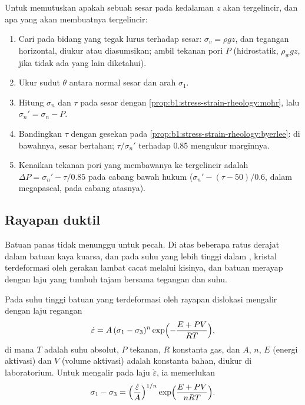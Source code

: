 \begin{method}\label{met:b1:stress-strain-rheology:slip-test}
Untuk memutuskan apakah sebuah sesar pada kedalaman $z$ akan tergelincir, dan apa yang akan membuatnya tergelincir:
\begin{enumerate}
  \item Cari  pada bidang yang tegak lurus terhadap  sesar: $\sigma_v = \rho g z$, dan tegangan horizontal, diukur atau diasumsikan; ambil tekanan pori $P$ (hidrostatik, $\rho_w g z$, jika tidak ada yang lain diketahui).
  \item Ukur sudut $\theta$ antara normal sesar dan arah $\sigma_1$.
  \item Hitung $\sigma_n$ dan $\tau$ pada sesar dengan \cref{prop:b1:stress-strain-rheology:mohr}, lalu $\sigma_n' = \sigma_n - P$.
  \item Bandingkan $\tau$ dengan gesekan pada \cref{prop:b1:stress-strain-rheology:byerlee}: di bawahnya, sesar bertahan; $\tau/\sigma_n'$ terhadap 0.85 mengukur marginnya.
  \item Kenaikan tekanan pori yang membawanya ke tergelincir adalah $\Delta P = \sigma_n' - \tau/0.85$ pada cabang bawah hukum ($\sigma_n' - (\tau - 50)/0.6$, dalam megapascal, pada cabang atasnya).
\end{enumerate}
\end{method}

\subsection*{Rayapan duktil}

Batuan panas tidak menunggu untuk pecah. Di atas beberapa ratus derajat dalam batuan kaya kuarsa, dan pada suhu yang lebih tinggi dalam , kristal terdeformasi oleh gerakan lambat cacat melalui kisinya, dan batuan merayap dengan laju yang tumbuh tajam bersama tegangan dan suhu.

\begin{proposition}\label{prop:b1:stress-strain-rheology:creep}
Pada suhu tinggi batuan yang terdeformasi oleh rayapan dislokasi mengalir dengan laju regangan
\[
  \dot\varepsilon = A\,(\sigma_1 - \sigma_3)^n \exp\Bigl(-\frac{E + PV}{RT}\Bigr),
\]
di mana $T$ adalah suhu absolut, $P$ tekanan, $R$ konstanta gas, dan $A$, $n$, $E$ (energi aktivasi) dan $V$ (volume aktivasi) adalah konstanta bahan, diukur di laboratorium. Untuk mengalir pada laju $\dot\varepsilon$, ia memerlukan 
\[
  \sigma_1 - \sigma_3 = \Bigl(\frac{\dot\varepsilon}{A}\Bigr)^{1/n}
  \exp\Bigl(\frac{E + PV}{nRT}\Bigr).
\]
\end{proposition}
\admitted

